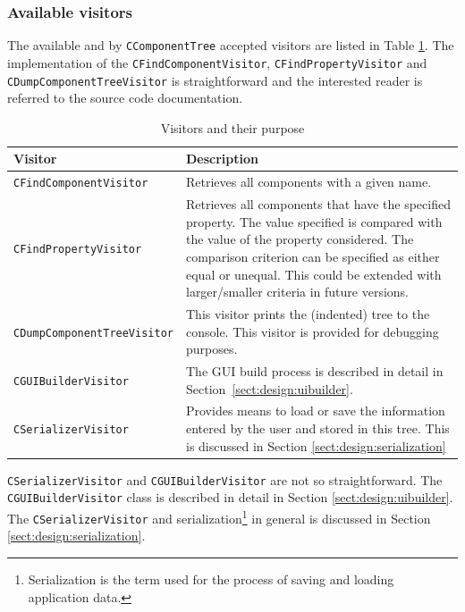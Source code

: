 \subsubsection*{Available visitors}
The available and by \verb=CComponentTree= accepted visitors are listed in
Table \ref{tab:design:visitors}. The implementation of the
\verb=CFindComponentVisitor=, \verb=CFindPropertyVisitor= and
\verb=CDumpComponentTreeVisitor= is straightforward and the interested reader
is referred to the source code documentation.
\begin{table}
\caption{Visitors and their purpose}
\label{tab:design:visitors}
\begin{tabular}{l|p{6cm}}
\hline
 \textsf{Visitor} & \textsf{Description} \\
\hline  %
    \verb=CFindComponentVisitor= & Retrieves all components with a given name. \\
    \verb=CFindPropertyVisitor=  & Retrieves all components that have the specified
    property. The value specified is compared with the value of the property
    considered. The comparison criterion can be specified as either equal or
    unequal. This could be extended with larger/smaller criteria in future
    versions. \\
    \verb=CDumpComponentTreeVisitor= & This visitor prints the (indented)
    tree to the console. This visitor is provided for debugging purposes. \\
    \verb=CGUIBuilderVisitor= & The GUI build process is described in detail in
    \mbox{Section \ref{sect:design:uibuilder}}.\\
    \verb=CSerializerVisitor= & Provides means to load or save the information
    entered by the user and stored in this tree. This is discussed in Section \ref{sect:design:serialization}\\
\hline
\end{tabular}
\end{table}

\verb=CSerializerVisitor= and \verb=CGUIBuilderVisitor= are not so
straightforward. The \verb=CGUIBuilderVisitor= class is described in detail in
Section \ref{sect:design:uibuilder}. The \linebreak \verb=CSerializerVisitor=
and serialization\footnote{Serialization is the term used for the process of
saving and loading application data.} in general is discussed in Section
\ref{sect:design:serialization}.


